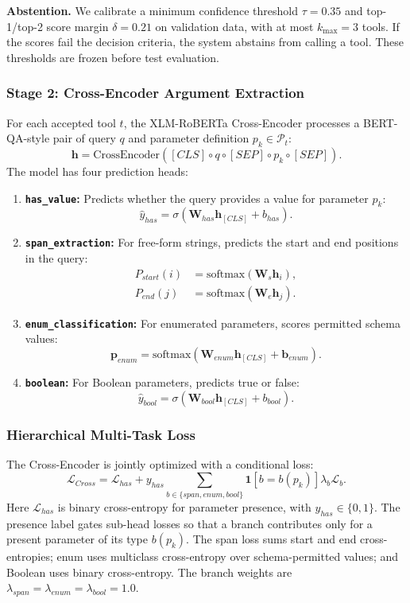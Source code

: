 \documentclass[10pt,twocolumn,a4paper]{article}
\begin{document}
\textbf{Abstention.} We calibrate a minimum confidence threshold $\tau=0.35$ and top-1/top-2 score margin $\delta=0.21$ on validation data, with at most $k_{\max}=3$ tools. If the scores fail the decision criteria, the system abstains from calling a tool. These thresholds are frozen before test evaluation.

\subsubsection{Stage 2: Cross-Encoder Argument Extraction}
For each accepted tool $t$, the XLM-RoBERTa Cross-Encoder processes a BERT-QA-style pair of query $q$ and parameter definition $p_k\in\mathcal{P}_t$:
\[
\mathbf{h}=\text{CrossEncoder}([CLS]\circ q\circ[SEP]\circ p_k\circ[SEP]).
\]
The model has four prediction heads:
\begin{enumerate}
    \item \textbf{\texttt{has\_value}:} Predicts whether the query provides a value for parameter $p_k$:
    \[\hat{y}_{has}=\sigma(\mathbf{W}_{has}\mathbf{h}_{[CLS]}+b_{has}).\]
    \item \textbf{\texttt{span\_extraction}:} For free-form strings, predicts the start and end positions in the query:
    \begin{align*}P_{start}(i)&=\text{softmax}(\mathbf{W}_s\mathbf{h}_i),\\P_{end}(j)&=\text{softmax}(\mathbf{W}_e\mathbf{h}_j).\end{align*}
    \item \textbf{\texttt{enum\_classification}:} For enumerated parameters, scores permitted schema values:
    \[\mathbf{p}_{enum}=\text{softmax}(\mathbf{W}_{enum}\mathbf{h}_{[CLS]}+\mathbf{b}_{enum}).\]
    \item \textbf{\texttt{boolean}:} For Boolean parameters, predicts true or false:
    \[\hat{y}_{bool}=\sigma(\mathbf{W}_{bool}\mathbf{h}_{[CLS]}+b_{bool}).\]
\end{enumerate}

\subsubsection{Hierarchical Multi-Task Loss}
The Cross-Encoder is jointly optimized with a conditional loss:
\[
\mathcal{L}_{Cross}=\mathcal{L}_{has}+y_{has}\sum_{b\in\{span,enum,bool\}}\mathbf{1}[b=b(p_k)]\lambda_b\mathcal{L}_b.
\]
Here $\mathcal{L}_{has}$ is binary cross-entropy for parameter presence, with $y_{has}\in\{0,1\}$. The presence label gates sub-head losses so that a branch contributes only for a present parameter of its type $b(p_k)$. The span loss sums start and end cross-entropies; enum uses multiclass cross-entropy over schema-permitted values; and Boolean uses binary cross-entropy. The branch weights are $\lambda_{span}=\lambda_{enum}=\lambda_{bool}=1.0$.
\end{document}
